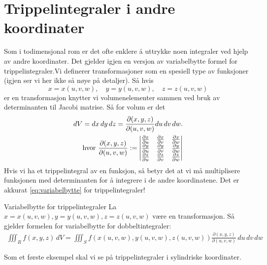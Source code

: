 \section{Trippelintegraler i andre koordinater}
Som i todimensjonal rom er det ofte enklere å uttrykke noen integraler ved hjelp av andre koordinater. Det gjelder igjen en versjon av variabelbytte formel  for trippelintegraler.Vi definerer transformasjoner som en spesiell type av funksjoner (igjen ser vi her ikke så nøye på detaljer). Så hvis \[x=x(u,v,w), \quad y=y(u,v,w), \quad z=z(u,v,w)\]
er en transformasjon knytter vi volumenelementer sammen ved bruk av determinanten til Jacobi matrise. Så for volum er det 
\begin{align}\label{eq:volum_variablebytte}
dV = dx\, dy\, dz = \frac{\partial (x,y,z)}{\partial (u,v,w)} du\, dv\, dw. \\ 
\text{hvor } \frac{\partial(x,y,z)}{\partial(u,v,w)}:= \begin{vmatrix} \frac{\partial x}{\partial u} & \frac{\partial x}{\partial v} & \frac{\partial x}{\partial w} \\ \frac{\partial y}{\partial u} & \frac{\partial y}{\partial v} & \frac{\partial y}{\partial w} \\ \frac{\partial z}{\partial u} & \frac{\partial z}{\partial v} & \frac{\partial z}{\partial w}\end{vmatrix}\notag\end{align}
Hvis vi ha et trippelintegral av en funksjon, så betyr det at vi må multiplisere funksjonen med determinanten for å integrere i de andre koordinatene. Det er akkurat \eqref{eq:variabelbytte} for trippelintegraler!
\begin{oppsum}{Variabelbytte for trippelintegraler}
La $x=x(u,v,w),y=y(u,v,w), z=z(u,v,w)$ være en transformasjon. Så gjelder formelen for variabelbytte for dobbeltintegraler:
\begin{align*}
\iiint_R f(x, y,z)\, dV = \iiint_S f(x(u, v,w), y(u, v,w), z(u,v,w))\frac{\partial(x, y,z)}{\partial(u, v,w)}\, du\, dv\, dw
\end{align*}
\end{oppsum}
Som et første eksempel skal vi se på trippelintegraler i sylindriske koordinater. 
